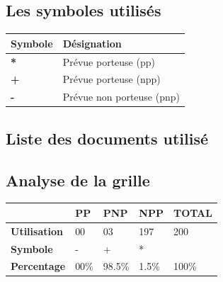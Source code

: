 \subsection{Les symboles utilisés}

\begin{table}[ht]
    \begin{tabularx}{\textwidth}{|X|X|}
    
    \hline
    \textbf{Symbole}    & \textbf{Désignation}   \\
    \hline
    \textbf{*}     &  Prévue porteuse (pp)  \\
    \hline
    \textbf{+}     &  Prévue porteuse (npp)  \\
    \hline
    \textbf{-}     &  Prévue non porteuse (pnp) \\
    \hline
    \end{tabularx}
    \end{table}
\subsection{Liste des documents utilisé}

\subsection{Analyse de la grille}
    \begin{table}[ht]
        \begin{tabularx}{\textwidth}{|X|X|X|X|X|}
        
            \hline
             & \textbf{PP}    & \textbf{PNP} & \textbf{NPP} & \textbf{TOTAL}   \\
            \hline
            \textbf{Utilisation} & 00 & 03 & 197 & 200  \\
            \hline
            \textbf{Symbole} & - & + & * &  \\
            \hline
            \textbf{Percentage} & 00\% & 98.5\% & 1.5\% & 100\% \\
            \hline
        \end{tabularx}
    \end{table}

